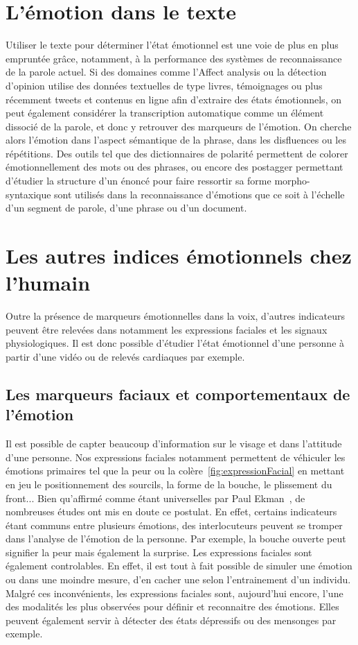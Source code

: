 \section{L'émotion dans le texte}
Utiliser le texte pour déterminer l'état émotionnel est une voie de plus en plus empruntée grâce, notamment, à la performance des systèmes de reconnaissance de la parole actuel.
Si des domaines comme l'Affect analysis ou la détection d'opinion utilise des données textuelles de type livres, témoignages ou plus récemment tweets et contenus en ligne afin d'extraire des états émotionnels, on peut également considérer la transcription automatique comme un élément dissocié de la parole, et donc y retrouver des marqueurs de l'émotion. On cherche alors l'émotion dans l'aspect sémantique de la phrase, dans les disfluences ou les répétitions.
Des outils tel que des dictionnaires de polarité permettent de colorer émotionnellement des mots ou des phrases, ou encore des postagger permettant d'étudier la structure d'un énoncé pour faire ressortir sa forme morpho-syntaxique sont utilisés dans la reconnaissance d'émotions que ce soit à l'échelle d'un segment de parole, d'une phrase ou d'un document.



\section{Les autres indices émotionnels chez l'humain}
Outre la présence de marqueurs émotionnelles dans la voix, d'autres indicateurs peuvent être relevées dans notamment les expressions faciales et les signaux physiologiques. Il est donc possible d'étudier l'état émotionnel d'une personne à partir d'une vidéo ou de relevés cardiaques par exemple.

\subsection{Les marqueurs faciaux et comportementaux de l'émotion}


Il est possible de capter beaucoup d'information sur le visage et dans l'attitude d'une personne. Nos expressions faciales notamment permettent de véhiculer les émotions primaires tel que la peur ou la colère~\ref{fig:expressionFacial} en mettant en jeu le positionnement des sourcils, la forme de la bouche, le plissement du front... Bien qu'affirmé comme étant universelles par Paul Ekman~\cite{Ekman1978}, de nombreuses études ont mis en doute ce postulat. En effet, certains indicateurs étant communs entre plusieurs émotions, des interlocuteurs peuvent se tromper dans l'analyse de l'émotion de la personne. Par exemple, la bouche ouverte peut signifier la peur mais également la surprise. Les expressions faciales sont également controlables. En effet, il est tout à fait possible de simuler une émotion ou dans une moindre mesure, d'en cacher une selon l'entrainement d'un individu.
Malgré ces inconvénients, les expressions faciales sont, aujourd'hui encore, l'une des modalités les plus observées pour définir et reconnaitre des émotions. Elles peuvent également servir à détecter des états dépressifs ou des mensonges par exemple.

